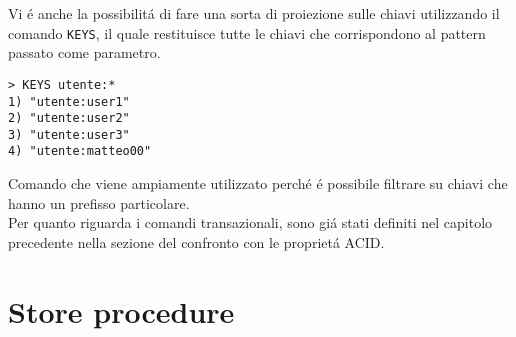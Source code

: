 Vi é anche la possibilitá di fare una sorta di proiezione sulle chiavi utilizzando il comando \texttt{KEYS}, il quale restituisce tutte le chiavi che corrispondono al pattern passato come parametro.
\begin{lstlisting}[autogobble]
> KEYS utente:*
1) "utente:user1"
2) "utente:user2"
3) "utente:user3"
4) "utente:matteo00"
\end{lstlisting}
Comando che viene ampiamente utilizzato perché é possibile filtrare su chiavi che hanno un prefisso particolare.\\

Per quanto riguarda i comandi transazionali, sono giá stati definiti nel capitolo precedente nella sezione del confronto con le proprietá ACID.

\section{Store procedure}



